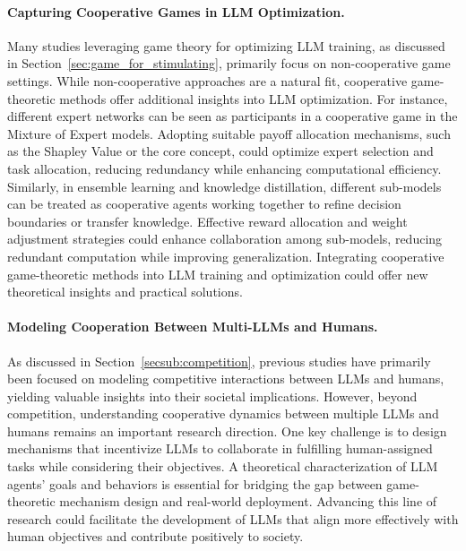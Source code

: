 \paragraph{Capturing Cooperative Games in LLM Optimization.}
Many studies leveraging game theory for optimizing LLM training, as discussed in Section~\ref{sec:game_for_stimulating}, primarily focus on non-cooperative game settings. While non-cooperative approaches are a natural fit, cooperative game-theoretic methods offer additional insights into LLM optimization.
For instance, different expert networks can be seen as participants in a cooperative game in the Mixture of Expert models. Adopting suitable payoff allocation mechanisms, such as the Shapley Value or the core concept, could optimize expert selection and task allocation, reducing redundancy while enhancing computational efficiency. Similarly, in ensemble learning and knowledge distillation, different sub-models can be treated as cooperative agents working together to refine decision boundaries or transfer knowledge. Effective reward allocation and weight adjustment strategies could enhance collaboration among sub-models, reducing redundant computation while improving generalization. 
Integrating cooperative game-theoretic methods into LLM training and optimization could offer new theoretical insights and practical solutions.

\paragraph{Modeling Cooperation Between Multi-LLMs and Humans.}
As discussed in Section~\ref{secsub:competition}, previous studies have primarily been focused on modeling competitive interactions between LLMs and humans, yielding valuable insights into their societal implications. However, beyond competition, understanding cooperative dynamics between multiple LLMs and humans remains an important research direction.
One key challenge is to design mechanisms that incentivize LLMs to collaborate in fulfilling human-assigned tasks while considering their objectives. A theoretical characterization of LLM agents' goals and behaviors is essential for bridging the gap between game-theoretic mechanism design and real-world deployment. Advancing this line of research could facilitate the development of LLMs that align more effectively with human objectives and contribute positively to society.

